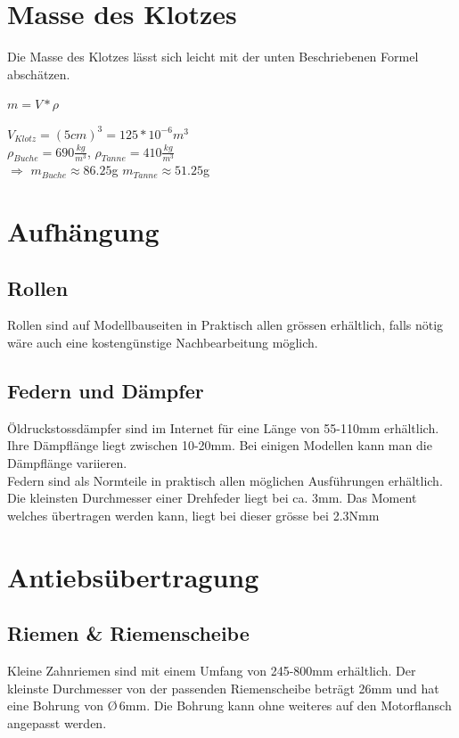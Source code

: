 \documentclass[a4paper]{report}
\begin{document}
\section{Masse des Klotzes}
	Die Masse des Klotzes lässt sich leicht mit der unten Beschriebenen Formel abschätzen.  \\
		\begin{center} 
			$m=V*\rho$ \\
		\end{center} 
 	\vspace*{1mm} 
		$V_{Klotz}=(5cm)^3=125*10^{-6} m^3$ \\
	\vspace*{8mm} 
		$\rho_{Buche}=690\frac{kg}{m^3}$, \hspace{5mm} 	$\rho_{Tanne}= 410\frac{kg}{m^3}$ \\
	\vspace{15mm}
		$\Rightarrow$ \hspace{10mm}  $m_{Buche} \approx 86.25$g \hspace*{10mm} $m_{Tanne} \approx 51.25$g
		
\section{Aufhängung}
	\subsection{Rollen}
		Rollen sind auf Modellbauseiten in Praktisch allen grössen erhältlich, falls nötig wäre auch eine kostengünstige Nachbearbeitung möglich.
	\subsection{Federn und Dämpfer}
		Öldruckstossdämpfer sind im Internet für eine Länge von 55-110mm erhältlich. Ihre Dämpflänge liegt zwischen 10-20mm. Bei einigen Modellen kann man die Dämpflänge variieren. \\
		Federn sind als Normteile in praktisch allen möglichen Ausführungen erhältlich. Die kleinsten Durchmesser einer Drehfeder liegt bei ca. 3mm. Das Moment welches übertragen werden kann, liegt bei dieser grösse bei 2.3Nmm

\section{Antiebsübertragung}
	\subsection{Riemen \& Riemenscheibe}
		Kleine Zahnriemen sind mit einem Umfang von 245-800mm erhältlich. Der kleinste Durchmesser von der passenden Riemenscheibe beträgt 26mm und hat eine Bohrung von \O \,6mm. Die Bohrung kann ohne weiteres auf den Motorflansch angepasst werden.
\end{document}
